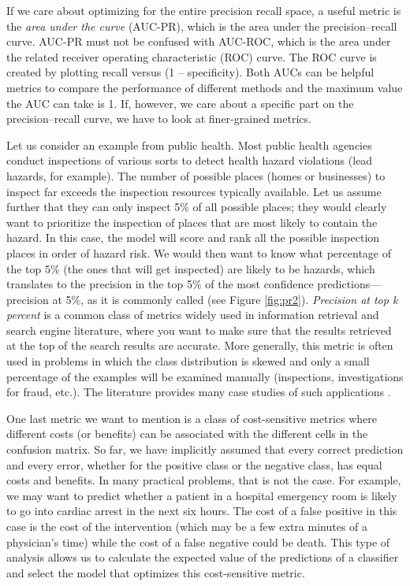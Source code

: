 \documentclass[]{krantz}
\begin{document}
If we care about optimizing for the entire precision recall space, a
useful metric is the \emph{area under the curve} (AUC-PR), which is the
area under the precision--recall curve. AUC-PR must not be confused with
AUC-ROC, which is the area under the related receiver operating
characteristic (ROC) curve. The ROC curve is created by plotting recall
versus (1 -- specificity). Both AUCs can be helpful metrics to compare
the performance of different methods and the maximum value the AUC can
take is 1. If, however, we care about a specific part on the
precision--recall curve, we have to look at finer-grained metrics.

Let us consider an example from public health. Most public health
agencies conduct inspections of various sorts to detect health hazard
violations (lead hazards, for example). The number of possible places
(homes or businesses) to inspect far exceeds the inspection resources
typically available. Let us assume further that they can only inspect
5\% of all possible places; they would clearly want to prioritize the
inspection of places that are most likely to contain the hazard. In this
case, the model will score and rank all the possible inspection places
in order of hazard risk. We would then want to know what percentage of
the top 5\% (the ones that will get inspected) are likely to be hazards,
which translates to the precision in the top 5\% of the most confidence
predictions---precision at 5\%, as it is commonly called (see Figure
\ref{fig:pr2}). \emph{Precision at top k percent} is a common class of
metrics widely used in information retrieval and search engine
literature, where you want to make sure that the results retrieved at
the top of the search results are accurate. More generally, this metric
is often used in problems in which the class distribution is skewed and
only a small percentage of the examples will be examined manually
(inspections, investigations for fraud, etc.). The literature provides
many case studies of such applications
\citep{Kumar2010, Lakkaraju2015, Potash2015}.

One last metric we want to mention is a class of cost-sensitive metrics
where different costs (or benefits) can be associated with the different
cells in the confusion matrix. So far, we have implicitly assumed that
every correct prediction and every error, whether for the positive class
or the negative class, has equal costs and benefits. In many practical
problems, that is not the case. For example, we may want to predict
whether a patient in a hospital emergency room is likely to go into
cardiac arrest in the next six hours. The cost of a false positive in
this case is the cost of the intervention (which may be a few extra
minutes of a physician's time) while the cost of a false negative could
be death. This type of analysis allows us to calculate the expected
value of the predictions of a classifier and select the model that
optimizes this cost-sensitive metric.
\end{document}
